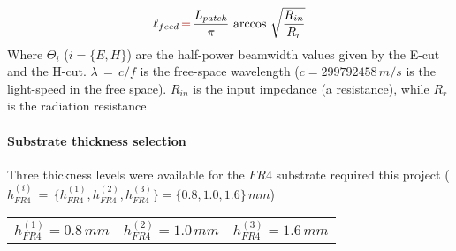 \documentclass[12pt,a4paper]{article}
\begin{document}
{	\begin{equation}
		\ell_{feed}\,{\color{Mahogany}=}\,\frac{L_{patch}}{\pi}\,\arccos\,\sqrt{\frac{R_{in}}{R_r}}
	\end{equation}
	Where $\Theta_i$ ($i=\{E,H\}$) are the half-power beamwidth values given by the E-cut and the H-cut. $\lambda\,=\,c/f$ is the free-space wavelength ($c=299 792 458\,m/s$ is the light-speed in the free space). $R_{in}$ is the input impedance (a resistance), while $R_r$ is the radiation resistance
	\paragraph{\selectfont\color{Turquoise}Substrate thickness selection}Three thickness levels were available for the $FR4$ substrate required this project ($h_{FR4}^{(i)}\,=\,\{h_{FR4}^{(1)},h_{FR4}^{(2)},h_{FR4}^{(3)}\}=\{0.8,1.0,1.6\}\,mm$)
	\begin{table}[h]
		\begin{center}
			{\selectfont
				\begin{tabular}{||m{3cm}|m{3cm}|m{3cm}||}
					\hline 
					\rowcolor{lightgray}\multicolumn{3}{|c|}{\textbf{FR4 substrate project thickness levels available}} 
					\\
					\hline
					\cellcolor{pink}$h_{FR4}^{(1)}=0.8\,mm$ & 
					\cellcolor{pink}$h_{FR4}^{(2)}=1.0\,mm$ & 
					\cellcolor{pink}$h_{FR4}^{(3)}=1.6\,mm$  \\
					\hline
					

\end{tabular}}
\end{center}
\end{table}}
\end{document}
